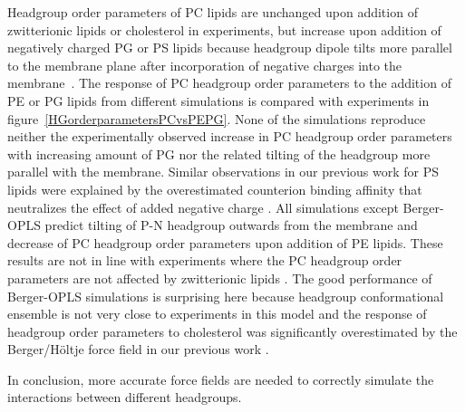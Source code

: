 \documentclass[journal=jpcbfk]{achemso}
\begin{document}
Headgroup order parameters of PC lipids are unchanged upon addition
of zwitterionic lipids or cholesterol in experiments, but increase
upon addition of negatively charged PG or PS lipids because
headgroup dipole tilts more parallel to the membrane plane after incorporation
of negative charges into the membrane~\cite{seelig87, scherer87,antila19}.
The response of PC headgroup order parameters to the addition of PE or PG lipids
from different simulations is compared with experiments in figure~\ref{HGorderparametersPCvsPEPG}.
None of the simulations reproduce neither the experimentally observed increase in PC headgroup order parameters
with increasing amount of PG nor the related tilting of the headgroup more parallel with the membrane.
Similar observations in our previous work for PS lipids were explained by the overestimated counterion
binding affinity that neutralizes the effect of added negative charge \cite{antila19}.
All simulations except Berger-OPLS predict tilting of P-N headgroup outwards from the membrane and
decrease of PC headgroup order parameters upon addition of PE lipids.
These results are not in line with experiments where the PC headgroup order parameters are not affected by zwitterionic lipids \cite{scherer87}.
The good performance of Berger-OPLS simulations is surprising here because
headgroup conformational ensemble is not very close to experiments in this model and
the response of headgroup order parameters
to cholesterol was significantly overestimated by the Berger/H{\"o}ltje force field in our previous work \cite{botan15}.

In conclusion, more accurate force fields are needed to correctly simulate the interactions between different headgroups.

\clearpage
\end{document}
